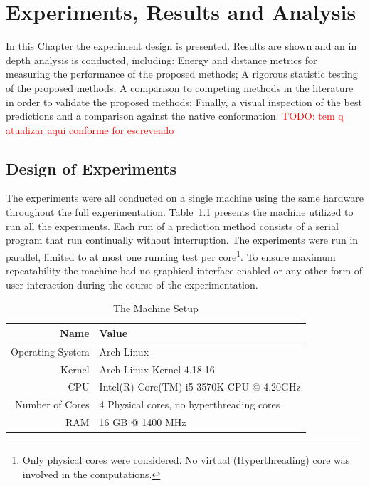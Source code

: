 \chapter{Experiments, Results and Analysis}\label{chap:experiments_and_results}

In this Chapter the experiment design is presented. Results are shown and an in
depth analysis is conducted, including: Energy and distance metrics for
measuring the performance of the proposed methods; A rigorous statistic testing
of the proposed methods; A comparison to competing methods in the literature in
order to validate the proposed methods; Finally, a visual inspection of the
best predictions and a comparison against the native conformation.
\textcolor{red}{TODO: tem q atualizar aqui conforme for escrevendo}

\section{Design of Experiments}\label{sec:design_of_experiments}

The experiments were all conducted on a single machine using the same hardware
throughout the full experimentation. Table~\ref{tab:machine-setup}
presents the machine utilized to run all the experiments. Each run of a
prediction method consists of a serial program that run continually without
interruption. The experiments were run in parallel, limited to at most one
running test per core\footnote{Only physical cores were considered. No virtual
(Hyperthreading) core was involved in the computations.}. To ensure maximum
repeatability the machine had no graphical interface enabled or any other form
of user interaction during the course of the experimentation.

\begin{table}[th]
    \centering
    \begin{tabular}{r|l} \hline \hline
        Name & Value \\ \hline \hline
        Operating System & Arch Linux \\ \hline
        Kernel &  Arch Linux Kernel 4.18.16 \\ \hline
        CPU & Intel(R) Core(TM) i5-3570K CPU @ 4.20GHz \\ \hline
        Number of Cores & 4 Physical cores, no hyperthreading cores \\ \hline
        RAM & 16 GB @ 1400 MHz \\ \hline \hline
    \end{tabular}
    \caption{The Machine Setup}
    \label{tab:machine-setup}
\end{table}

